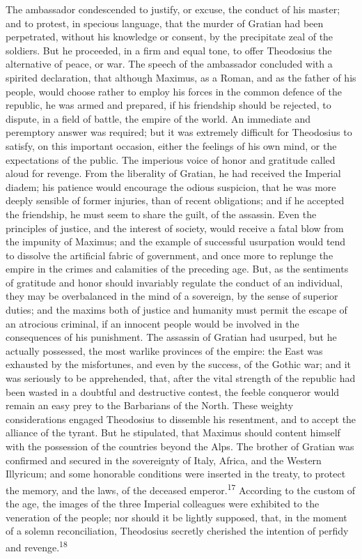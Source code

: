 The ambassador condescended to justify, or excuse, the conduct of
his master; and to protest, in specious language, that the murder
of Gratian had been perpetrated, without his knowledge or
consent, by the precipitate zeal of the soldiers. But he
proceeded, in a firm and equal tone, to offer Theodosius the
alternative of peace, or war. The speech of the ambassador
concluded with a spirited declaration, that although Maximus, as
a Roman, and as the father of his people, would choose rather to
employ his forces in the common defence of the republic, he was
armed and prepared, if his friendship should be rejected, to
dispute, in a field of battle, the empire of the world. An
immediate and peremptory answer was required; but it was
extremely difficult for Theodosius to satisfy, on this important
occasion, either the feelings of his own mind, or the
expectations of the public. The imperious voice of honor and
gratitude called aloud for revenge. From the liberality of
Gratian, he had received the Imperial diadem; his patience would
encourage the odious suspicion, that he was more deeply sensible
of former injuries, than of recent obligations; and if he
accepted the friendship, he must seem to share the guilt, of the
assassin. Even the principles of justice, and the interest of
society, would receive a fatal blow from the impunity of Maximus;
and the example of successful usurpation would tend to dissolve
the artificial fabric of government, and once more to replunge
the empire in the crimes and calamities of the preceding age.
But, as the sentiments of gratitude and honor should invariably
regulate the conduct of an individual, they may be overbalanced
in the mind of a sovereign, by the sense of superior duties; and
the maxims both of justice and humanity must permit the escape of
an atrocious criminal, if an innocent people would be involved in
the consequences of his punishment. The assassin of Gratian had
usurped, but he actually possessed, the most warlike provinces of
the empire: the East was exhausted by the misfortunes, and even
by the success, of the Gothic war; and it was seriously to be
apprehended, that, after the vital strength of the republic had
been wasted in a doubtful and destructive contest, the feeble
conqueror would remain an easy prey to the Barbarians of the
North. These weighty considerations engaged Theodosius to
dissemble his resentment, and to accept the alliance of the
tyrant. But he stipulated, that Maximus should content himself
with the possession of the countries beyond the Alps. The brother
of Gratian was confirmed and secured in the sovereignty of Italy,
Africa, and the Western Illyricum; and some honorable conditions
were inserted in the treaty, to protect the memory, and the laws,
of the deceased emperor.\textsuperscript{17} According to the custom of the age,
the images of the three Imperial colleagues were exhibited to the
veneration of the people; nor should it be lightly supposed,
that, in the moment of a solemn reconciliation, Theodosius
secretly cherished the intention of perfidy and revenge.\textsuperscript{18}

